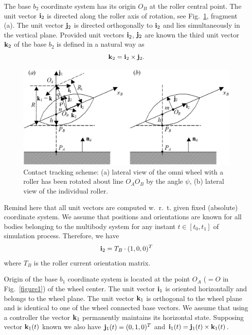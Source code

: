 \documentclass{jsme-tj}
\begin{document}
The base $b_2$ coordinate system has its origin $O_B$ at the roller central
point. The unit vector ${\bf i}_2$ is directed along the roller axis of 
rotation, see Fig.~\ref{figure2}, fragment (a). The unit vector ${\bf j}_2$ is 
directed orthogonally to ${\bf i}_2$ and lies simultaneously in the vertical 
plane. Provided unit vectors ${\bf i}_2$, ${\bf j}_2$ are known the third unit 
vector ${\bf k}_2$ of the base $b_2$ is defined in a natural way as
\begin{equation}
{\bf k}_2={\bf i}_2\times {\bf j}_2.\label{k_2}
\end{equation}

\begin{figure}[htb]
\begin{center}
\includegraphics[bb= 0 0 19.50cm 10cm,scale=0.75]{ContactScheme.png}
\caption{Contact tracking scheme: (a) lateral view of the omni wheel with a 
roller has been rotated about line $O_AO_B$ by the angle $\psi $, (b) lateral 
view of the individual roller.}
\end{center}
\label{figure2}
\end{figure}

Remind here that all unit vectors are computed w.~r.~t. given fixed (absolute)
coordinate system. We assume that positions and orientations are known for all 
bodies belonging to the multibody system for any instant $t\in [t_0,t_1]$ of 
simulation process. Therefore, we have
\begin{equation}
{\bf i}_2=T_B\cdot (1,0,0)^T\label{i_2}
\end{equation}
where $T_B$ is the roller current orientation matrix.

Origin of the base $b_1$ coordinate system is located at the point $O_A$ ($=O$
in Fig.~\ref{figure1}) of the wheel center. The unit vector ${\bf i}_1$ 
is oriented horizontally and belongs to the wheel plane. The unit vector 
${\bf k}_1$ is orthogonal to the wheel plane and is identical to one of the 
wheel connected base vectors. We assume that using a controller the vector 
${\bf k}_1$ permanently maintains its horizontal state. Supposing vector 
${\bf k}_1(t)$ known we also have ${\bf j}_1(t)=(0,1,0)^T$ and 
${\bf i}_1(t)={\bf j}_1(t)\times {\bf k}_1(t)$.
\end{document}
